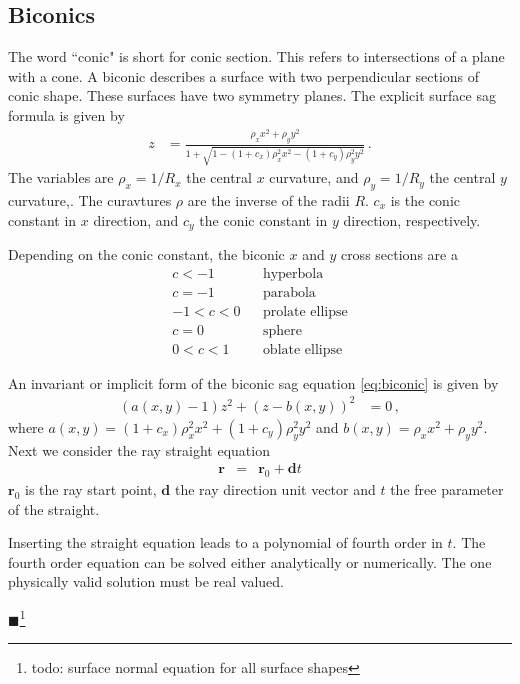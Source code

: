\documentclass[12pt,a4paper,twoside,openright,BCOR10mm,headsepline,titlepage,abstracton,chapterprefix,final]{scrreprt}
\newcommand\Vector[1]{{\mathbf{#1}}}
\newcommand\Location{\Vector{r}}
\newcommand{\remark}[1]{{\color{red}$\blacksquare$}\footnote{{\color{red}#1}}}
\begin{document}
\subsection{Biconics}
The word ``conic" is short for conic section. 
This refers to intersections of a plane with a cone.
A biconic describes a surface with two perpendicular sections of conic shape. 
These surfaces have two symmetry planes.
The explicit surface sag formula is given by
\begin{align}
 z &= \frac{\rho_x x^2 + \rho_y y^2}{1 + \sqrt{1 - (1+c_x) \rho_x^2 x^2 - (1+c_y) \rho_y^2 y^2}} \label{eq:biconic}\,.
\end{align}
The variables are $\rho_x = 1/R_x$ the central $x$ curvature, and $\rho_y = 1/R_y$ the central $y$ curvature,.
The curavtures $\rho$ are the inverse of the radii $R$.
$c_x$ is the conic constant in $x$ direction,
and $c_y$ the conic constant in $y$ direction, respectively. 

Depending on the conic constant, the biconic $x$ and $y$ cross sections are a
\begin{eqnarray*}
     c < -1 && \textrm{hyperbola} \\
     c = -1 && \textrm{parabola} \\
-1 < c < 0 && \textrm{prolate ellipse} \\
     c = 0 && \textrm{sphere} \\
 0 < c < 1 && \textrm{oblate ellipse}
\end{eqnarray*}


An invariant or implicit form of the biconic sag equation \eqref{eq:biconic} is given by
\begin{align}
 (a(x,y) - 1) z^2 + (z - b(x,y))^2 &= 0\,,\label{eq:biconicImplicitSag}
\end{align}
where $a(x,y) = (1 + c_x) \rho_x^2 x^2 + (1 + c_y) \rho_y^2 y^2$ and $b(x,y) = \rho_x x^2 + \rho_y y^2$. 
Next we consider the ray straight equation
\begin{eqnarray}
 \Location &=& \Location_0 + \Vector{d} t \label{eq:ray}
\end{eqnarray}
$\Location_0$ is the ray start point, $\Vector{d}$ the ray direction unit vector and $t$ the free parameter of the straight.

Inserting the straight equation leads to a polynomial of fourth order in $t$.
The fourth order equation can be solved either analytically or numerically.
The one physically valid solution must be real valued.

\remark{todo: surface normal equation for all surface shapes}
\end{document}
